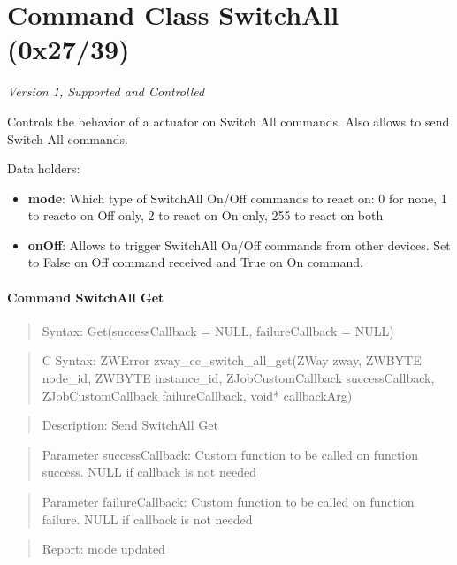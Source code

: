 \section{Command Class SwitchAll (0x27/39)}

\textit{Version 1, Supported and Controlled}
\newline

Controls the behavior of a actuator on Switch All commands. Also allows to send Switch All commands.
\newline

\noindent
Data holders:

\begin{itemize}
\item \textbf{mode}: Which type of SwitchAll On/Off commands to react on: 0 for none, 1 to reacto on Off only, 2 to react on On only, 255 to react on both
\item \textbf{onOff}: Allows to trigger SwitchAll On/Off commands from other devices. Set to False on Off command received and True on On command.
\end{itemize}

\paragraph{Command SwitchAll Get}
\begin{quote}Syntax: Get(successCallback = NULL, failureCallback = NULL)\end{quote}
\begin{quote}C Syntax: ZWError zway\_cc\_switch\_all\_get(ZWay zway, ZWBYTE node\_id, ZWBYTE instance\_id, ZJobCustomCallback successCallback, ZJobCustomCallback failureCallback, void* callbackArg)\end{quote}
\begin{quote}Description: Send SwitchAll Get\end{quote}
\begin{quote}Parameter successCallback: Custom function to be called on function success. NULL if callback is not needed\end{quote}
\begin{quote}Parameter failureCallback: Custom function to be called on function failure. NULL if callback is not needed\end{quote}
\begin{quote}Report: mode updated\end{quote}

